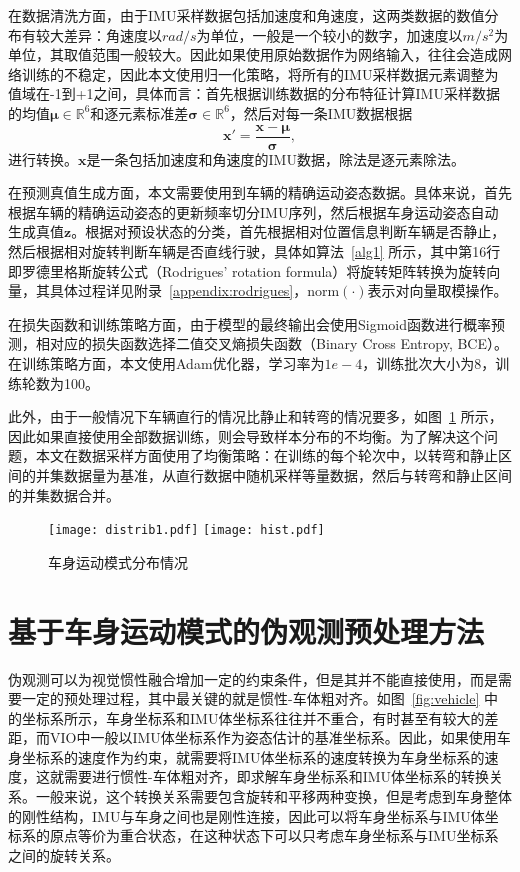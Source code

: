 在数据清洗方面，由于IMU采样数据包括加速度和角速度，这两类数据的数值分布有较大差异：角速度以$rad/s$为单位，一般是一个较小的数字，加速度以$m/s^2$为单位，其取值范围一般较大。因此如果使用原始数据作为网络输入，往往会造成网络训练的不稳定，因此本文使用归一化策略，将所有的IMU采样数据元素调整为值域在-1到+1之间，具体而言：首先根据训练数据的分布特征计算IMU采样数据的均值$\symbf{\mu}\in \mathbb{R}^6$和逐元素标准差$\symbf{\sigma}\in \mathbb{R}^6$，然后对每一条IMU数据根据
\begin{equation}
  \symbf{x}' = \frac{\symbf{x} - \symbf{\mu}}{\symbf{\sigma}},
\end{equation}
进行转换。$\symbf{x}$是一条包括加速度和角速度的IMU数据，除法是逐元素除法。

在预测真值生成方面，本文需要使用到车辆的精确运动姿态数据。具体来说，首先根据车辆的精确运动姿态的更新频率切分IMU序列，然后根据车身运动姿态自动生成真值$\symbf{z}$。根据对预设状态的分类，首先根据相对位置信息判断车辆是否静止，然后根据相对旋转判断车辆是否直线行驶，具体如算法~\ref{alg1} 所示，其中第16行即罗德里格斯旋转公式（Rodrigues' rotation formula）\cite{wang2023dual}将旋转矩阵转换为旋转向量，其具体过程详见附录~\ref{appendix:rodrigues}，$\text{norm}(\cdot)$表示对向量取模操作。

在损失函数和训练策略方面，由于模型的最终输出会使用Sigmoid函数进行概率预测，相对应的损失函数选择二值交叉熵损失函数（Binary Cross Entropy, BCE）。在训练策略方面，本文使用Adam优化器\cite{kingma2017adam}，学习率为$1e-4$，训练批次大小为8，训练轮数为100。

此外，由于一般情况下车辆直行的情况比静止和转弯的情况要多，如图~\ref{fig:data_distrib} 所示，因此如果直接使用全部数据训练，则会导致样本分布的不均衡。为了解决这个问题，本文在数据采样方面使用了均衡策略：在训练的每个轮次中，以转弯和静止区间的并集数据量为基准，从直行数据中随机采样等量数据，然后与转弯和静止区间的并集数据合并。

\begin{figure}
  \centering
  \texttt{[image: distrib1.pdf]}
  \texttt{[image: hist.pdf]}
  \caption{车身运动模式分布情况}
  \label{fig:data_distrib}
\end{figure}

\section{基于车身运动模式的伪观测预处理方法}

伪观测可以为视觉惯性融合增加一定的约束条件，但是其并不能直接使用，而是需要一定的预处理过程，其中最关键的就是惯性-车体粗对齐。如图~\ref{fig:vehicle} 中的坐标系所示，车身坐标系和IMU体坐标系往往并不重合，有时甚至有较大的差距，而VIO中一般以IMU体坐标系作为姿态估计的基准坐标系。因此，如果使用车身坐标系的速度作为约束，就需要将IMU体坐标系的速度转换为车身坐标系的速度，这就需要进行惯性-车体粗对齐，即求解车身坐标系和IMU体坐标系的转换关系。一般来说，这个转换关系需要包含旋转和平移两种变换，但是考虑到车身整体的刚性结构，IMU与车身之间也是刚性连接，因此可以将车身坐标系与IMU体坐标系的原点等价为重合状态，在这种状态下可以只考虑车身坐标系与IMU坐标系之间的旋转关系。

